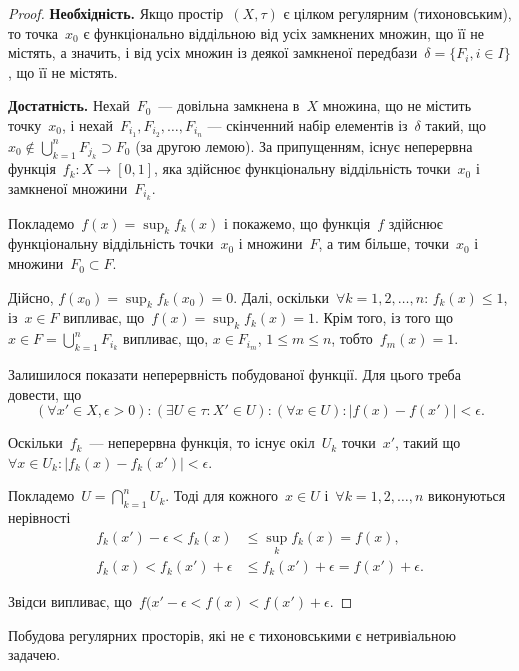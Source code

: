 \begin{proof}
    \textbf{Необхідність.} Якщо простір~$(X, \tau)$ є цілком регулярним (тихоновським), то точка~$x_0$ є функціонально віддільною від усіх замкнених множин, що її не містять, а значить, і від усіх множин із деякої замкненої передбази~$\delta = \{F_i, i \in I\}$, що її не містять.

    \textbf{Достатність.} Нехай~$F_0$~--- довільна замкнена в~$X$ множина, що не містить точку~$x_0$, і нехай~$F_{i_1}, F_{i_2}, \ldots, F_{i_n}$ --- скінченний набір елементів із~$\delta$ такий, що~$x_0 \notin \bigcup_{k = 1}^n F_{j_k} \supset F_0$ (за другою лемою). За припущенням, існує неперервна функція~$f_k: X \to [0, 1]$, яка здійснює функціональну віддільність точки~$x_0$ і замкненої множини~$F_{i_k}$.

    Покладемо~$f(x) = \sup_k f_k(x)$ і покажемо, що функція~$f$ здійснює функціональну віддільність точки~$x_0$ і множини~$F$, а тим більше, точки~$x_0$ і множини~$F_0 \subset F$.

    Дійсно, $f(x_0) = \sup_k f_k(x_0) = 0$. Далі, оскільки~$\forall k = 1, 2, \ldots, n$: $f_k(x) \le 1$, із~$x \in F$ випливає, що~$f(x) = \sup_k f_k(x) = 1$. Крім того, із того що~$x \in F = \bigcup_{k = 1}^n F_{i_k}$ випливає, що, $x \in F_{i_m}$, $1 \le m \le n$, тобто~$f_m(x) = 1$.

    Залишилося показати неперервність побудованої функції. Для цього треба довести, що \[ (\forall x' \in X, \epsilon > 0): (\exists U \in \tau: X' \in U): (\forall x \in U): |f(x) - f(x')| < \epsilon. \]

    Оскільки~$f_k$~--- неперервна функція, то існує окіл~$U_k$ точки~$x'$, такий що~$\forall x \in U_k: |f_k(x) - f_k(x')| < \epsilon$.

    Покладемо~$U = \bigcap_{k = 1}^n U_k$. Тоді для кожного~$x \in U$ і~$\forall k = 1, 2, \ldots, n$ виконуються нерівності
    \begin{align*}
        f_k(x') - \epsilon < f_k(x) &\le \sup_k f_k(x) = f(x), \\
        f_k(x) < f_k(x') + \epsilon &\le f_k(x') + \epsilon = f(x') + \epsilon.
    \end{align*}

    Звідси випливає, що~$f(x' - \epsilon < f(x) < f(x') + \epsilon$.
\end{proof}

\begin{remark}
    Побудова регулярних просторів, які не є тихоновськими є нетривіальною задачею.
\end{remark}

